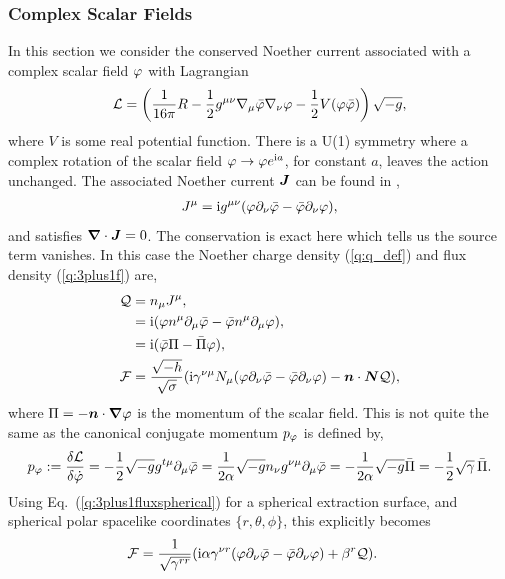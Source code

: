 \subsubsection{Complex Scalar Fields} \label{q:sect:noether1}
In this section we consider the conserved Noether current associated with a complex scalar field $\varphi$ with Lagrangian
\begin{equation}
\label{q:csfl}\mathcal{L} = \left(\frac{1}{16 \pi }R -\frac{1}{2}g^{\mu\nu}\nabla_\mu \bar{\varphi} \nabla_\nu \varphi - \frac{1}{2}V(\varphi \bar{\varphi}) \right)\sqrt{-g},
\end{equation}
where $V$ is some real potential function. There is a U(1) symmetry where a complex rotation of the scalar field $\varphi \rightarrow \varphi e^{{\rm i} a}$, for constant $a$, leaves the action unchanged. The associated Noether current $\boldsymbol{J}$ can be found in \cite{liebling2017dynamical},
\begin{align}
J^\mu = {\rm i} g^{\mu\nu}(\varphi\partial_\nu \bar{\varphi} - \bar{\varphi}\partial_\nu \varphi),
\end{align}
and satisfies $\boldsymbol{\nabla}\cdot\boldsymbol{J} = 0$. The conservation is exact here which tells us the source term vanishes. In this case the Noether charge density (\ref{q:q_def}) and flux density (\ref{q:3plus1f}) are,
\begin{align}
\mathcal{Q}&= n_\mu J^\mu, \\
           &= {\rm i} (\varphi n^\mu\partial_\mu \bar{\varphi} - \bar{\varphi} n^\mu\partial_\mu \varphi), \\
           & = {\rm i}(\bar{\varphi} \Pi - \bar\Pi \varphi), \\
\mathcal{F} &= \frac{\sqrt{-h}}{\sqrt{\sigma}}({\rm i}\gamma^{\nu \mu}N_\mu (\varphi \partial_\nu \bar{\varphi} - \bar{\varphi} \partial_\nu \varphi) - \boldsymbol{n} \cdot \boldsymbol{N}  \mathcal{Q}),
\end{align}
where $\Pi = -\boldsymbol{n} \cdot\boldsymbol{\nabla}\varphi$ is the momentum of the scalar field.
This is not quite the same as the canonical conjugate momentum $p_\varphi$ is defined by,
\begin{equation}
p_\varphi := \frac{\delta \mathcal{L}}{\delta \dot{\varphi}} = -\frac{1}{2}\sqrt{-g} g^{t\mu}\partial_\mu \bar{\varphi} = \frac{1}{2\alpha} \sqrt{-g}n_\nu g^{\nu\mu} \partial_\mu \bar{\varphi} =  -\frac{1}{2\alpha} \sqrt{-g}\bar{\Pi} =  -\frac{1}{2} \sqrt{\gamma}\,\bar{\Pi}.
\end{equation}
Using Eq.~(\ref{q:3plus1fluxspherical}) for a spherical extraction surface, and spherical polar spacelike coordinates $\{r,\theta,\phi\}$, this explicitly becomes
\begin{align}
\mathcal{F} &= \frac{1}{\sqrt{\gamma^{rr}}}({\rm i}\alpha\gamma^{\nu r} (\varphi \partial_\nu \bar{\varphi} - \bar{\varphi} \partial_\nu \varphi) + {\beta^r} \mathcal{Q}).
       \end{align}




